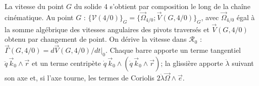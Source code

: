 \begin{corrigebox}
La vitesse du point $G$ du solide 4 s'obtient par composition le long
                de la chaîne cinématique. Au point $G$ :
                $\{\mathcal V(4/0)\}_G=\{\vec\Omega_{4/0};\vec V(G,4/0)\}_G$, avec
                $\vec\Omega_{4/0}$ égal à la somme algébrique des vitesses angulaires des
                pivots traversés et $\vec V(G,4/0)$ obtenu par changement de point.
On dérive la vitesse dans $\mathcal R_0$ :
                $\vec\Gamma(G,4/0)=d\vec V(G,4/0)/dt|_0$. Chaque barre apporte un terme
                tangentiel $\ddot q\,\vec k_0\wedge\vec r$ et un terme centripète
                $\dot q\,\vec k_0\wedge(\dot q\,\vec k_0\wedge\vec r)$; la glissière
                apporte $\ddot\lambda$ suivant son axe et, si l'axe tourne, les termes de
                Coriolis $2\dot\lambda\vec\Omega\wedge\vec e$.
\end{corrigebox}
